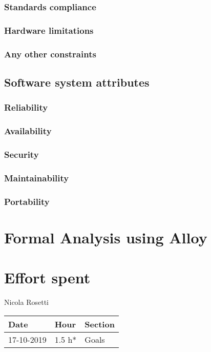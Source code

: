 \documentclass[a4paper]{report}
\begin{document}
\subsection{Standards compliance}
\lipsum[1]
\subsection{Hardware limitations}
\lipsum[1]
\subsection{Any other constraints}
\lipsum[1]
\section{Software system attributes}
\subsection{Reliability}
\lipsum[1]
\subsection{Availability}
\lipsum[1]
\subsection{Security}
\lipsum[1]
\subsection{Maintainability}
\lipsum[1]
\subsection{Portability}
\lipsum[1]

\chapter{Formal Analysis using Alloy}
\lipsum[3]

\chapter{Effort spent}

\begin{center}
Nicola Rosetti \\
\begin{tabular}{lll}
\toprule
Date & Hour & Section \\
\midrule
17-10-2019 & 1.5 h* & Goals \\
\bottomrule
\end{tabular}
\end{center}
\end{document}
